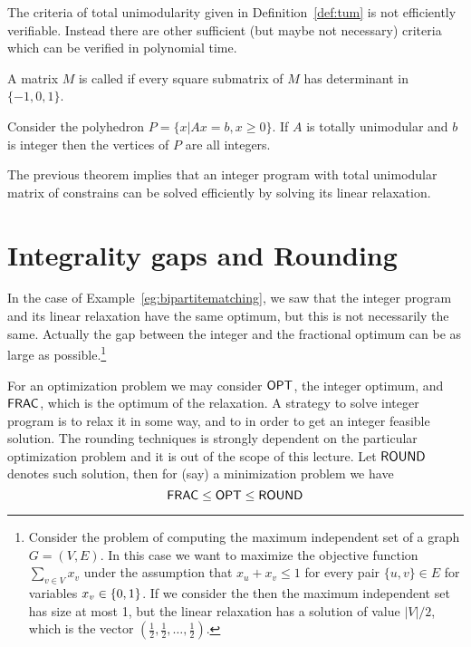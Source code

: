 \documentclass[a4paper,twoside,justified]{tufte-handout}
\begin{document}
\begin{marginfigure}
  The criteria of total unimodularity given in Definition~\ref{def:tum} is
  not efficiently verifiable. Instead there are other sufficient (but
  maybe not necessary) criteria which can be verified in polynomial time.
\end{marginfigure}

\begin{definition}\label{def:tum}
  A matrix $ M $ is called  if every
  square submatrix of $ M $ has determinant in $\{-1,0,1\}$.
\end{definition}

\begin{theorem}
  Consider the polyhedron $ P=\{x | Ax=b, x\geq 0\}$.  If $ A $ is
  totally unimodular and $ b $ is integer then the vertices of $ P$
  are all integers.
\end{theorem}

The previous theorem implies that an integer program with total
unimodular matrix of constrains can be solved efficiently by solving
its linear relaxation.


\section{Integrality gaps and Rounding}

In the case of Example~\ref{eg:bipartitematching}, we saw that the
integer program and its linear relaxation have the same optimum, but
this is not necessarily the same. Actually the gap between the integer
and the fractional optimum can be as large as possible.\footnote{%
  Consider the problem of computing the maximum independent set of a
  graph $ G=(V,E) $. In this case we want to maximize the objective
  function $ \sum_{v\in V} x_{v} $ under the assumption that $
  x_{u}+x_{v}\leq 1 $ for every pair $ \{u,v\}\in E$ for variables $
  x_{v}\in\{0,1\}$. If we consider the 
  then the maximum independent set has size at most 1, but the linear
  relaxation has a solution of value $ |V|/2 $, which is the vector $
  (\frac{1}{2},\frac{1}{2},\ldots,\frac{1}{2})$.}

For an optimization problem we may consider $\mathsf{OPT}$, the integer
optimum, and $ \mathsf{FRAC}$, which is the optimum of the relaxation. A
strategy to solve integer program is to relax it in some way, and to
 in order to get an
integer feasible solution. The rounding techniques is strongly
dependent on the particular optimization problem and it is out of the
scope of this lecture.
%
Let $ \mathsf{ROUND} $ denotes such solution, then for (say) a minimization problem
we have
\begin{equation}
  \label{eq:round_opt_frac}
  \sFRAC \leq \sOPT \leq \sROUND
\end{equation}
\end{document}
